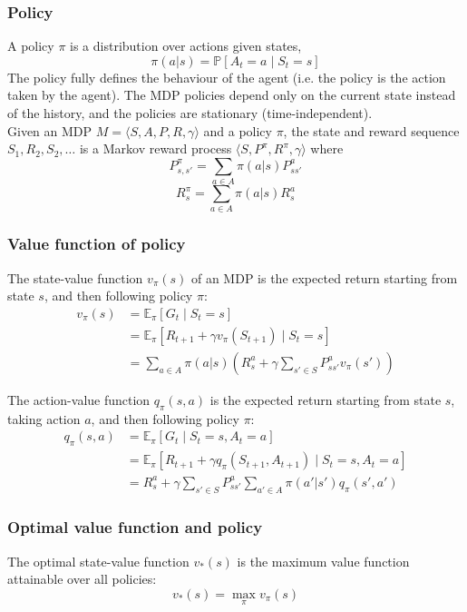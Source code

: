 \documentclass{article} %
\begin{document}
\subsubsection{Policy}
A policy \(\pi\) is a distribution over actions given states,
\[
\pi(a|s) = \mathbb{P}[A_t = a \mid S_t = s]
\]
The policy fully defines the behaviour of the agent (i.e. the policy is the action taken by the agent). The MDP policies depend only on the current state instead of the history, and the policies are stationary (time-independent).\\
Given an MDP \( M = \langle S, A, P, R, \gamma \rangle \) and a policy \(\pi\), the state and reward sequence \( S_1, R_2, S_2, \ldots \) is a Markov reward process \(\langle S, P^\pi, R^\pi, \gamma \rangle\)
where
\[
P_{s,s'}^\pi = \sum_{a \in A} \pi(a|s) P_{ss'}^a
\]
\[
R_s^\pi = \sum_{a \in A} \pi(a|s) R_s^a
\]


\subsubsection{Value function of policy}
The state-value function \( v_\pi(s) \) of an MDP is the expected return starting from state \( s \), and then following policy \( \pi \):
\begin{align*}
v_\pi(s) &= \mathbb{E}_\pi \left[ G_t \mid S_t = s \right]\\
&= \mathbb{E}_{\pi} \left[ R_{t+1} + \gamma v_{\pi}(S_{t+1}) \mid S_t = s \right]\\
&= \sum_{a \in A} \pi(a|s) \left( R_s^a + \gamma \sum_{s' \in S} P_{ss'}^a v_{\pi}(s') \right)
\end{align*}

The action-value function \( q_\pi(s, a) \) is the expected return starting from state \( s \), taking action \( a \), and then following policy \( \pi \):
\begin{align*}
q_\pi(s, a) &= \mathbb{E}_\pi \left[ G_t \mid S_t = s, A_t = a \right]\\
&=\mathbb{E}_{\pi} \left[ R_{t+1} + \gamma q_{\pi}(S_{t+1}, A_{t+1}) \mid S_t = s, A_t = a \right]\\
&= R_s^a + \gamma \sum_{s' \in S} P_{ss'}^a \sum_{a' \in A} \pi(a'|s') q_{\pi}(s', a')
\end{align*}

\subsubsection{Optimal value function and policy}
The optimal state-value function \( v_*(s) \) is the maximum value function attainable over all policies:
\[
v_*(s) = \max_{\pi} v_\pi(s)
\]
\end{document}
